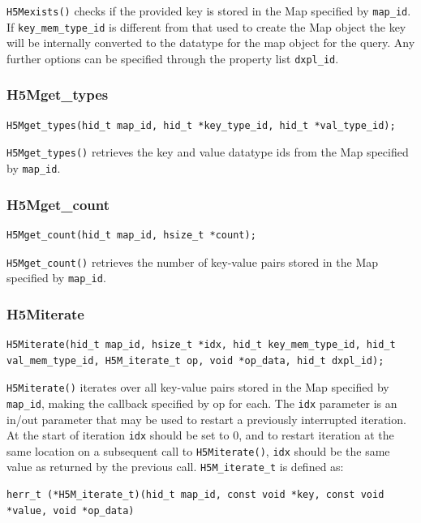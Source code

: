 \verb+H5Mexists()+ checks if the provided key is stored in the Map specified by \verb+map_id+. If \verb+key_mem_type_id+ is different from that used to create the Map object the key will be internally converted to the datatype for the map object for the query. Any further options can be specified through the property list \verb+dxpl_id+.

\subsubsection{H5Mget\_types}

{
\begin{lstlisting}
H5Mget_types(hid_t map_id, hid_t *key_type_id, hid_t *val_type_id);
\end{lstlisting}
}

\verb+H5Mget_types()+ retrieves the key and value datatype ids from the Map specified by \verb+map_id+.

\subsubsection{H5Mget\_count}

{
\begin{lstlisting}
H5Mget_count(hid_t map_id, hsize_t *count);
\end{lstlisting}
}

\verb+H5Mget_count()+ retrieves the number of key-value pairs stored in the Map specified by \verb+map_id+.

\subsubsection{H5Miterate}

{
\begin{lstlisting}
H5Miterate(hid_t map_id, hsize_t *idx, hid_t key_mem_type_id, hid_t val_mem_type_id, H5M_iterate_t op, void *op_data, hid_t dxpl_id);
\end{lstlisting}
}

\verb+H5Miterate()+ iterates over all key-value pairs stored in the Map specified by \verb+map_id+, making the callback specified by op for each. The \verb+idx+ parameter is an in/out parameter that may be used to restart a previously interrupted iteration. At the start of iteration \verb+idx+ should be set to 0, and to restart iteration at the same location on a subsequent call to \verb+H5Miterate()+, \verb+idx+ should be the same value as returned by the previous call.
\verb+H5M_iterate_t+ is defined as:
{
\begin{lstlisting}
herr_t (*H5M_iterate_t)(hid_t map_id, const void *key, const void *value, void *op_data)
\end{lstlisting}
}

